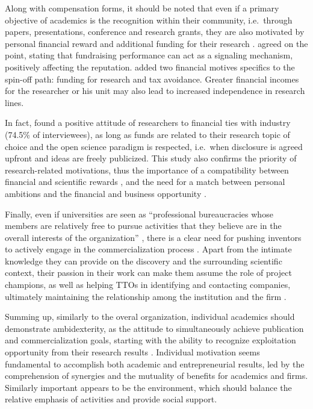 Along with compensation forms, it should be noted that even if a primary objective of academics is the recognition within their community, i.e.\ through papers, presentations, conference and research grants, they are also motivated by personal financial reward and additional funding for their research \citep{Siegel2003a, Link2007, Fini2009}. \citet{DEste2007, DEste2011} agreed on the point, stating that fundraising performance can act as a signaling mechanism, positively affecting the reputation. \citet{Rizzo2015} added two financial motives specifics to the spin-off path: funding for research and tax avoidance. Greater financial incomes for the researcher or his unit may also lead to increased independence in research lines.

In fact, \citet{DEste2011} found a positive attitude of researchers to financial ties with industry (74.5\% of interviewees), as long as funds are related to their research topic of choice and the open science paradigm is respected, i.e.\ when disclosure is agreed upfront and ideas are freely publicized. This study also confirms the priority of research-related motivations, thus the importance of a compatibility between financial and scientific rewards \citep{Baldini2007, Link2007}, and the need for a match between personal ambitions and the financial and business opportunity \citep{Tijssen2006}.

Finally, even if universities are seen as \enquote{professional bureaucracies whose members are relatively free to pursue activities that they believe are in the overall interests of the organization} \citep{DEste2011}, there is a clear need for pushing inventors to actively engage in the commercialization process \citep{Jensen1998}. Apart from the intimate knowledge they can provide on the discovery and the surrounding scientific context, their passion in their work can make them assume the role of project champions, as well as helping TTOs in identifying and contacting companies, ultimately maintaining the relationship among the institution and the firm \citep{Markman2005}.

Summing up, similarly to the overal organization, individual academics should demonstrate ambidexterity, as the attitude to simultaneously achieve publication and commercialization goals, starting with the ability to recognize exploitation opportunity from their research results \citep{Chang2016}. Individual motivation seems fundamental to accomplish both academic and entrepreneurial results, led by the comprehension of synergies and the mutuality of benefits for academics and firms. Similarly important appears to be the environment, which should balance the relative emphasis of activities and provide social support. 

